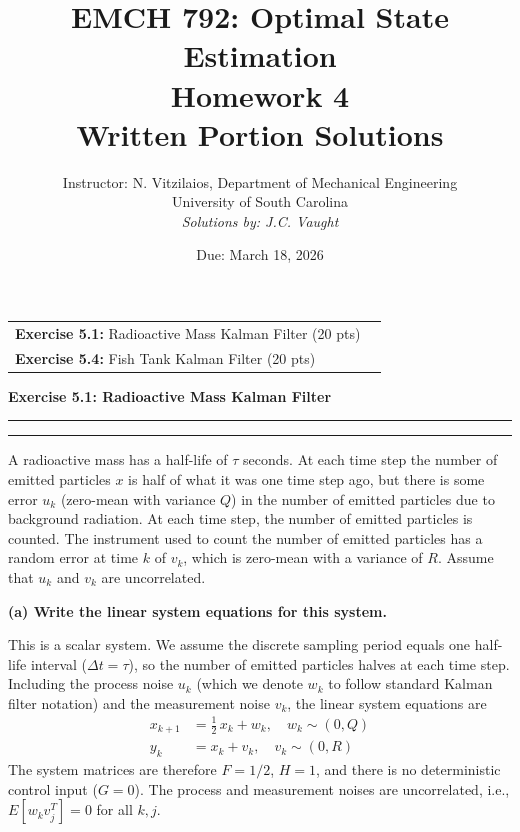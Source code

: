 \documentclass[12pt]{article}
\title{EMCH 792: Optimal State Estimation \\ Homework 4 \\ \large{Written Portion Solutions}}
\author{Instructor: N. Vitzilaios, Department of Mechanical Engineering \\ University of South Carolina \\ \textit{Solutions by: J.C. Vaught}}
\date{Due: March 18, 2026}
\newcommand{\question}[1]{%
  \clearpage
  \vspace{0.5cm}
  {\noindent\normalsize \textbf{#1}}
  \vspace{0.2cm}
  \hrule
  \vspace{0.1cm}
  \hrule
  \vspace{0.3cm}
}
\begin{document}
\maketitle
\setlength{\parindent}{0pt}

\begin{center}
\begin{tcolorbox}[colback=white, colframe=gray!50!black, colbacktitle=gray!20!white,
                  coltitle=black, sharp corners, boxrule=1pt,
                  title=\Large\bfseries Table of Contents]
\begin{tabular}{p{}r}
\textbf{Exercise 5.1:} Radioactive Mass Kalman Filter (20 pts) \dotfill & \textbf{\pageref{ex:5.1}} \\[0.3em]
\textbf{Exercise 5.4:} Fish Tank Kalman Filter (20 pts) \dotfill & \textbf{\pageref{ex:5.4}} \\

\end{tabular}
\vspace{0.2cm}
\end{tcolorbox}
\end{center}

\question{Exercise 5.1: Radioactive Mass Kalman Filter}\label{ex:5.1}
A radioactive mass has a half-life of $\tau$ seconds. At each time step the number of emitted particles $x$ is half of what it was one time step ago, but there is some error $u_k$ (zero-mean with variance $Q$) in the number of emitted particles due to background radiation. At each time step, the number of emitted particles is counted. The instrument used to count the number of emitted particles has a random error at time $k$ of $v_k$, which is zero-mean with a variance of $R$. Assume that $u_k$ and $v_k$ are uncorrelated.

\begin{stepbox}
\textbf{(a) Write the linear system equations for this system.}

\vspace{0.3cm}

This is a scalar system. We assume the discrete sampling period equals one half-life interval ($\Delta t = \tau$), so the number of emitted particles halves at each time step. Including the process noise $u_k$ (which we denote $w_k$ to follow standard Kalman filter notation) and the measurement noise $v_k$, the linear system equations are
\begin{align}
x_{k+1} &= \tfrac{1}{2}\, x_k + w_k, \quad w_k \sim (0, Q) \label{eq:5.1_state} \\
y_k &= x_k + v_k, \quad v_k \sim (0, R) \label{eq:5.1_meas}
\end{align}
The system matrices are therefore $F = 1/2$, $H = 1$, and there is no deterministic control input ($G = 0$). The process and measurement noises are uncorrelated, i.e., $E[w_k v_j^T] = 0$ for all $k, j$.

\end{stepbox}
\end{document}
